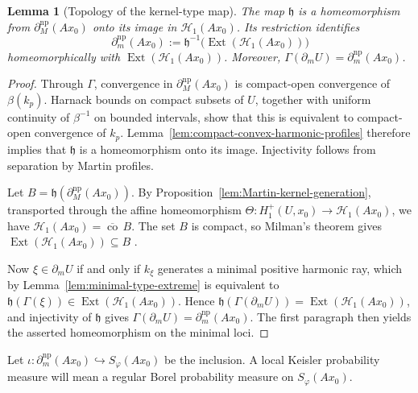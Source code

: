 \documentclass{amsart}
\newtheorem{lemma}[theorem]{Lemma}
\theoremstyle{definition}
\theoremstyle{remark}
\numberwithin{equation}{section}
\begin{document}
\begin{lemma}[Topology of the kernel-type map]
\label{prop:kernel-type-homeomorphism}
The map $\mathfrak h$ is a homeomorphism from $\partial_M^{\mathrm{np}}(Ax_0)$ onto its image in $\mathscr H_1(Ax_0)$. Its restriction identifies
$$\partial_m^{\mathrm{np}}(Ax_0):=\mathfrak h^{-1}\bigl(\operatorname{Ext}(\mathscr H_1(Ax_0))\bigr)$$
homeomorphically with $\operatorname{Ext}(\mathscr H_1(Ax_0))$. Moreover, $\Gamma(\partial_mU)=\partial_m^{\mathrm{np}}(Ax_0)$.
\end{lemma}

\begin{proof}
Through $\Gamma$, convergence in
$\partial_M^{\mathrm{np}}(Ax_0)$ is compact-open convergence of
$\beta(k_p)$. Harnack bounds on compact subsets of $U$, together
with uniform continuity of $\beta^{-1}$ on bounded intervals, show
that this is equivalent to compact-open convergence of $k_p$.
Lemma~\ref{lem:compact-convex-harmonic-profiles} therefore implies
that $\mathfrak h$ is a homeomorphism onto its image. Injectivity
follows from separation by Martin profiles.

Let
$B=\mathfrak h(\partial_M^{\mathrm{np}}(Ax_0))$.
By Proposition~\ref{lem:Martin-kernel-generation}, transported through the
affine homeomorphism
$\Theta:H_1^+(U,x_0)\to\mathscr H_1(Ax_0)$,
we have
$\mathscr H_1(Ax_0)=\overline{\operatorname{co}}\,B$.
The set $B$ is compact, so Milman's theorem gives
$\operatorname{Ext}(\mathscr H_1(Ax_0))\subseteq B$
\cite[Proposition~1.5]{Phelps2001Choquet}.

Now $\xi\in\partial_mU$ if and only if $k_\xi$ generates a minimal
positive harmonic ray, which by
Lemma~\ref{lem:minimal-type-extreme} is equivalent to
$\mathfrak h(\Gamma(\xi))\in
\operatorname{Ext}(\mathscr H_1(Ax_0))$.
Hence
$\mathfrak h(\Gamma(\partial_mU))
=\operatorname{Ext}(\mathscr H_1(Ax_0))$,
and injectivity of $\mathfrak h$ gives
$\Gamma(\partial_mU)=\partial_m^{\mathrm{np}}(Ax_0)$.
The first paragraph then yields the asserted homeomorphism on the
minimal loci.
\end{proof}

Let $\iota:\partial_m^{\mathrm{np}}(Ax_0)\hookrightarrow S_\varphi(Ax_0)$ be the inclusion. A local Keisler probability measure will mean a regular Borel probability measure on $S_\varphi(Ax_0)$.
\end{document}
